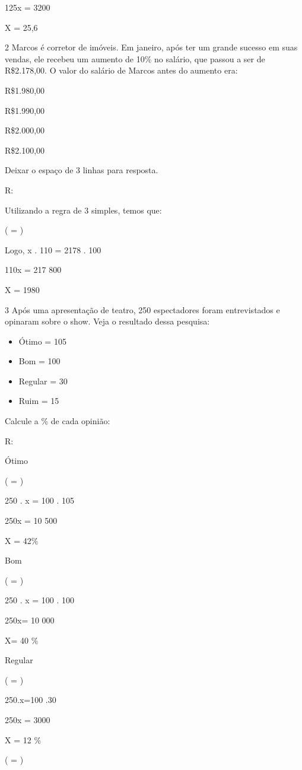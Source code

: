 {125x = 3200

X = 25,6

\num{2} Marcos é corretor de imóveis. Em janeiro, após ter um grande sucesso
em suas vendas, ele recebeu um aumento de 10\% no salário, que passou a
ser de R\$2.178,00. O valor do salário de Marcos antes do aumento era:
\item R\$1.980,00
\item R\$1.990,00
\item R\$2.000,00
\item R\$2.100,00

Deixar o espaço de 3 linhas para resposta.

R:

Utilizando a regra de 3 simples, temos que:

( = )

Logo, x . 110 = 2178 . 100

110x = 217 800

X = 1980

\num{3} Após uma apresentação de teatro, 250 espectadores foram entrevistados
e opinaram sobre o show. Veja o resultado dessa pesquisa:

\begin{itemize}
\item
  Ótimo = 105
\item
  Bom = 100
\item
  Regular = 30
\item
  Ruim = 15
\end{itemize}

Calcule a \% de cada opinião:

R:

Ótimo

( = )

250 . x = 100 . 105

250x = 10 500

X = 42\%

Bom

( = )

250 . x = 100 . 100

250x= 10 000

X= 40 \%

Regular

( = )

250.x=100 .30

250x = 3000

X = 12 \%

( = )

}
